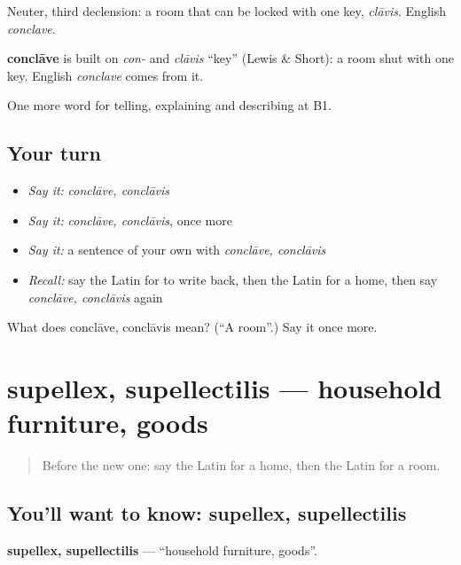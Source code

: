 Neuter, third declension: a room that can be locked with one key, \emph{clāvis}. English \emph{conclave}.

\begin{cousinweb}
\textbf{conclāve} is built on \emph{con-} and \emph{clāvis} \textquotedblleft{}key\textquotedblright{} (Lewis \& Short): a room shut with one key. English \emph{conclave} comes from it.
\end{cousinweb}

\begin{grammarlens}[title={What you've built}]
One more word for telling, explaining and describing at B1.
\end{grammarlens}

\subsection*{Your turn}
\begin{itemize}
\raggedright
  \item \emph{Say it:} \emph{conclāve, conclāvis}
  \item \emph{Say it:} \emph{conclāve, conclāvis}, once more
  \item \emph{Say it:} a sentence of your own with \emph{conclāve, conclāvis}
  \item \emph{Recall:} say the Latin for to write back, then the Latin for a home, then say \emph{conclāve, conclāvis} again
\end{itemize}

\begin{tcolorbox}[breakable,colback=teal!4,colframe=teal!35!black,title={Before you move on}]
What does conclāve, conclāvis mean? (\textquotedblleft{}A room\textquotedblright{}.) Say it once more.
\end{tcolorbox}
\section[supellex, supellectilis]{supellex, supellectilis — household furniture, goods}

\label{lesson:LA-C552-supellex}



\begin{quote}
Before the new one: say the Latin for a home, then the Latin for a room.
\end{quote}

\subsection*{You'll want to know: supellex, supellectilis}
\textbf{supellex, supellectilis} — \textquotedblleft{}household furniture, goods\textquotedblright{}.

